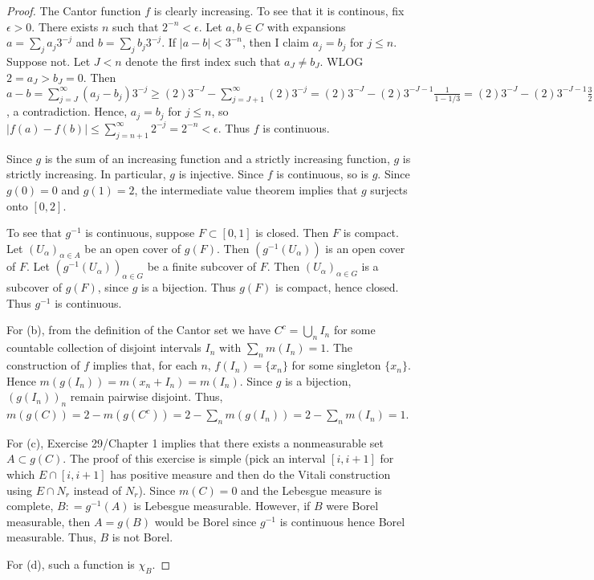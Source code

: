 \documentclass{article}
\begin{document}
\begin{proof}
The Cantor function $f$ is clearly increasing. To see that it is continous, fix $\epsilon > 0$.  There exists $n$ such that $2^{-n} < \epsilon$.  Let $a, b \in C$ with expansions $a = \sum_j a_j 3^{-j}$ and $b = \sum_j b_j 3^{-j}$.  If $|a - b| < 3^{-n}$, then I claim $a_j = b_j$ for $j \le n$. Suppose not. Let $J < n$ denote the first index such that $a_J \neq b_J$. WLOG $2 = a_J > b_J = 0$.  Then $a - b = \sum_{j = J}^\infty (a_j - b_j) 3^{-j} \ge (2)3^{-J} - \sum_{j = J+1}^\infty (2) 3^{-j}  = (2)3^{-J} - (2)3^{-J - 1} \frac 1 {1 - 1/3} = (2)3^{-J} - (2)3^{-J - 1} \frac 3 2   =  3^{-J} > 3^{-n}$, a contradiction.  Hence, $a_j = b_j$ for $j \le n$, so $|f(a) - f(b)| \le \sum_{j=n+1}^\infty 2^{-j} = 2^{-n} < \epsilon$.  Thus $f$ is continuous.

Since $g$ is the sum of an increasing function and a strictly increasing function, $g$ is strictly increasing.  In particular, $g$ is injective.  Since $f$ is continuous, so is $g$.  Since $g(0) = 0$ and $g(1) = 2$, the intermediate value theorem implies that $g$ surjects onto $[0, 2]$.  

To see that $g^{-1}$ is continuous, suppose $F \subset [0,1]$ is closed.  Then $F$ is compact.  Let $(U_\alpha)_{\alpha \in A}$ be an open cover of $g(F)$. Then $(g^{-1}(U_\alpha))$ is an open cover of $F$. Let $(g^{-1}(U_\alpha))_{\alpha \in G}$ be a finite subcover of $F$.  Then $(U_\alpha)_{\alpha \in G}$ is a subcover of $g(F)$, since $g$ is a bijection.  Thus $g(F)$ is compact, hence closed.  Thus $g^{-1}$ is continuous.

For (b), from the definition of the Cantor set we have $C^c = \bigcup_n I_n$ for some countable collection of disjoint intervals $I_n$ with $\sum_n m(I_n) = 1$.  The construction of $f$ implies that, for each $n$,  $f(I_n) = \{x_n\}$ for some singleton $\{x_n\}$.  Hence $m(g(I_n)) = m(x_n + I_n) = m(I_n)$.  Since $g$ is a bijection, $(g(I_n))_n$ remain pairwise disjoint.  Thus, $m(g(C)) = 2 - m(g(C^c)) = 2 - \sum_n m(g(I_n)) = 2 - \sum_n m(I_n) = 1$.

For (c), Exercise 29/Chapter 1 implies that there exists a nonmeasurable set $A \subset g(C)$. The proof of this exercise is simple (pick an interval $[i, i+1]$ for which $E \cap [i,i+1]$ has positive measure and then do the Vitali construction using $E \cap N_r$ instead of $N_r$).  Since $m(C) = 0$ and the Lebesgue measure is complete, $B: = g^{-1}(A)$ is Lebesgue measurable.   However, if $B$ were Borel measurable, then $A = g(B)$ would be Borel since $g^{-1}$ is continuous hence Borel measurable.  Thus, $B$ is not Borel.

For (d), such a function is $\chi_B$.
\end{proof}
\end{document}

